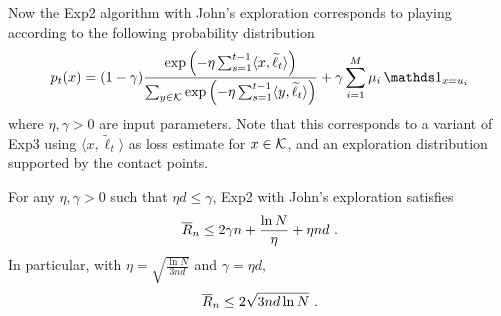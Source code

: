 Now the Exp2 algorithm with John's exploration corresponds to playing according to the following probability distribution
\begin{equation}
\label{eq:exp2def}
p_t(x) = (1- \gamma) \frac{\exp\left(- \eta \sum_{s=1}^{t-1} \langle x, \tilde{\ell}_t \rangle  \right)}{\sum_{y \in \cK} \exp\left(- \eta \sum_{s=1}^{t-1} \langle y, \tilde{\ell}_t \rangle  \right)} + \gamma \sum_{i=1}^M \mu_i\,\ds1_{x = u_i}
\end{equation}
where $\eta,\gamma > 0$ are input parameters. Note that this corresponds to a variant of Exp3 using $\langle x, \tilde{\ell}_t \rangle$ as loss estimate for $x \in \mathcal{K}$, and an exploration distribution supported by the contact points.
%
\begin{theorem} \label{th:exp2john}
For any $\eta,\gamma > 0$ such that ${\eta d} \le {\gamma}$, Exp2 with John's exploration satisfies
$$\overline{R}_n \leq 2 \gamma n + \frac{\ln N}{\eta} + \eta n d~.$$
In particular, with $\eta = \sqrt{\frac{\ln N}{3 n d}}$ and $\gamma = \eta d$,
$$\overline{R}_n \leq 2 \sqrt{3 n d \ln N}~.$$
\end{theorem}
%
